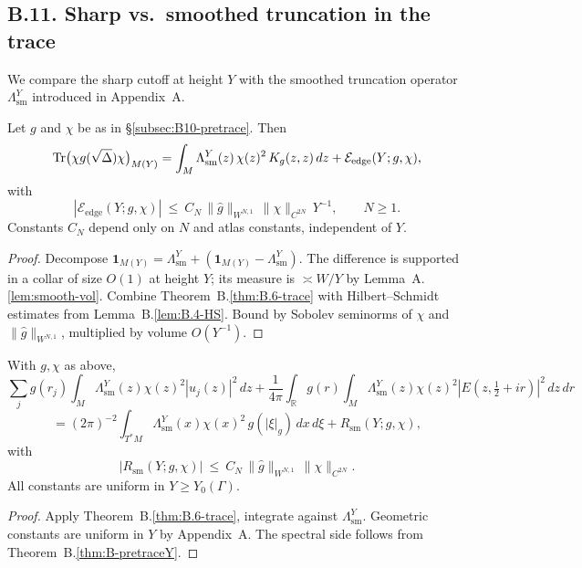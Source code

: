 
\subsection*{B.11. Sharp vs.\ smoothed truncation in the trace}
\label{subsec:B11-trunc}

We compare the sharp cutoff at height $Y$ with the smoothed truncation operator
$\Lambda^Y_{\mathrm{sm}}$ introduced in Appendix~A.

\begin{proposition}
\label{prop:B-truncdiff}
Let $g$ and $\chi$ be as in \S\ref{subsec:B10-pretrace}. Then
\[
\operatorname{Tr}\!\big(\chi g(\sqrt\Delta)\chi\big)_{M(Y)}
= \int_M \Lambda^Y_{\mathrm{sm}}(z)\,\chi(z)^2\,K_g(z,z)\,dz
+ \mathcal E_{\mathrm{edge}}(Y;g,\chi),
\]
with
\[
|\mathcal E_{\mathrm{edge}}(Y;g,\chi)|
\ \le\ C_N\,
\|\widehat g\|_{W^{N,1}}\,
\|\chi\|_{C^{2N}}\,Y^{-1},\qquad N\ge1.
\]
Constants $C_N$ depend only on $N$ and atlas constants, independent of $Y$.
\end{proposition}

\begin{proof}
Decompose $\mathbf 1_{M(Y)}=\Lambda^Y_{\mathrm{sm}}+(\mathbf 1_{M(Y)}-\Lambda^Y_{\mathrm{sm}})$.
The difference is supported in a collar of size $O(1)$ at height $Y$; its measure
is $\asymp W/Y$ by Lemma~A.\ref{lem:smooth-vol}. Combine Theorem~B.\ref{thm:B.6-trace}
with Hilbert–Schmidt estimates from Lemma~B.\ref{lem:B.4-HS}. Bound by Sobolev
seminorms of $\chi$ and $\|\widehat g\|_{W^{N,1}}$, multiplied by volume $O(Y^{-1})$.
\end{proof}

\begin{theorem}
\label{thm:B-smoothtrace}
With $g,\chi$ as above,
\[
\sum_j g(r_j)\int_M \Lambda^Y_{\mathrm{sm}}(z)\chi(z)^2|u_j(z)|^2\,dz
+ \frac{1}{4\pi}\int_{\mathbb R} g(r)\int_M \Lambda^Y_{\mathrm{sm}}(z)\chi(z)^2|E(z,\tfrac12+ir)|^2\,dz\,dr
\]
\[
=(2\pi)^{-2}\int_{T^*M}\Lambda^Y_{\mathrm{sm}}(x)\chi(x)^2\,g(|\xi|_g)\,dx\,d\xi
+ R_{\mathrm{sm}}(Y;g,\chi),
\]
with
\[
|R_{\mathrm{sm}}(Y;g,\chi)| \ \le\ C_N \,\|\widehat g\|_{W^{N,1}}\,\|\chi\|_{C^{2N}}.
\]
All constants are uniform in $Y\ge Y_0(\Gamma)$.
\end{theorem}

\begin{proof}
Apply Theorem~B.\ref{thm:B.6-trace}, integrate against $\Lambda^Y_{\mathrm{sm}}$.
Geometric constants are uniform in $Y$ by Appendix~A. The spectral side follows
from Theorem~B.\ref{thm:B-pretraceY}.
\end{proof}

